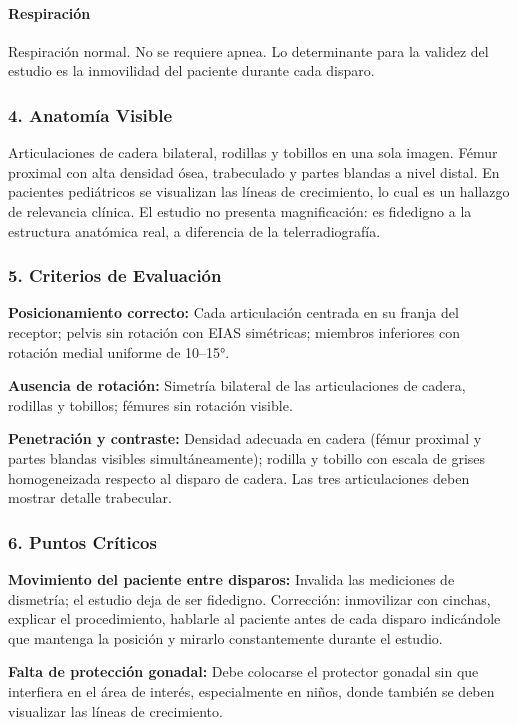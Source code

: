 	\paragraph{Respiración}
	Respiración normal. No se requiere apnea. Lo determinante para la validez del estudio es la inmovilidad del paciente durante cada disparo.
	
	\subsubsection*{4. Anatomía Visible}
	
	Articulaciones de cadera bilateral, rodillas y tobillos en una sola imagen. Fémur proximal con alta densidad ósea, trabeculado y partes blandas a nivel distal. En pacientes pediátricos se visualizan las líneas de crecimiento, lo cual es un hallazgo de relevancia clínica. El estudio no presenta magnificación: es fidedigno a la estructura anatómica real, a diferencia de la telerradiografía.
	
	\subsubsection*{5. Criterios de Evaluación}
	
	\textbf{Posicionamiento correcto:} Cada articulación centrada en su franja del receptor; pelvis sin rotación con EIAS simétricas; miembros inferiores con rotación medial uniforme de 10--15°.
	
	\textbf{Ausencia de rotación:} Simetría bilateral de las articulaciones de cadera, rodillas y tobillos; fémures sin rotación visible.
	
	\textbf{Penetración y contraste:} Densidad adecuada en cadera (fémur proximal y partes blandas visibles simultáneamente); rodilla y tobillo con escala de grises homogeneizada respecto al disparo de cadera. Las tres articulaciones deben mostrar detalle trabecular.
	
	\subsubsection*{6. Puntos Críticos}
	
	\textbf{Movimiento del paciente entre disparos:} Invalida las mediciones de dismetría; el estudio deja de ser fidedigno. Corrección: inmovilizar con cinchas, explicar el procedimiento, hablarle al paciente antes de cada disparo indicándole que mantenga la posición y mirarlo constantemente durante el estudio.
	
	\textbf{Falta de protección gonadal:} Debe colocarse el protector gonadal sin que interfiera en el área de interés, especialmente en niños, donde también se deben visualizar las líneas de crecimiento.
	
